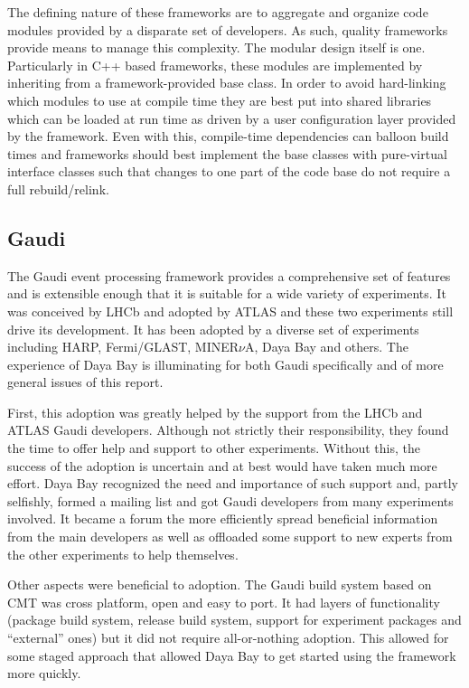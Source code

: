 The defining nature of these frameworks are to aggregate and organize
code modules provided by a disparate set of developers.  As such,
quality frameworks provide means to manage this complexity.  The
modular design itself is one.  Particularly in C++ based frameworks,
these modules are implemented by inheriting from a framework-provided
base class. In order to avoid hard-linking which modules to use at
compile time they are best put into shared libraries which can be
loaded at run time as driven by a user configuration layer provided by
the framework.  Even with this, compile-time dependencies can balloon
build times and frameworks should best implement the base classes with
pure-virtual interface classes such that changes to one part of the
code base do not require a full rebuild/relink.

\subsection{Gaudi}

The Gaudi event processing framework provides a comprehensive set of
features and is extensible enough that it is suitable for a wide
variety of experiments.  It was conceived by LHCb and adopted by ATLAS
and these two experiments still drive its development.  It has been
adopted by a diverse set of experiments including HARP, Fermi/GLAST,
MINER$\nu$A, Daya Bay and others.  The experience of Daya Bay is
illuminating for both Gaudi specifically and of more general issues of
this report.

First, this adoption was greatly helped by the support from the LHCb
and ATLAS Gaudi developers.  Although not strictly their
responsibility, they found the time to offer help and support to other
experiments.  Without this, the success of the adoption is uncertain
and at best would have taken much more effort.  Daya Bay recognized
the need and importance of such support and, partly selfishly, formed
a mailing list\cite{gauditalk} and got Gaudi developers from many
experiments involved.  It became a forum the more efficiently spread
beneficial information from the main developers as well as offloaded
some support to new experts from the other experiments to help
themselves.

Other aspects were beneficial to adoption.  The Gaudi build system
based on CMT was cross platform, open and easy to port.  It had layers
of functionality (package build system, release build system, support
for experiment packages and ``external'' ones) but it did not require
all-or-nothing adoption.  This allowed for some staged approach that
allowed Daya Bay to get started using the framework more quickly.

